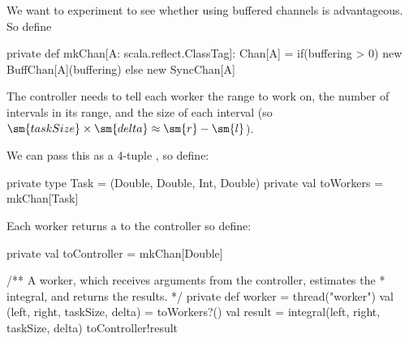 

\begin{slide}

We want to experiment to see whether using buffered channels is advantageous.
So define
\begin{scala}
  private def mkChan[A: scala.reflect.ClassTag]: Chan[A] = 
    if(buffering > 0) new BuffChan[A](buffering) else new SyncChan[A]
\end{scala}

The controller needs to tell each worker the range \SCALA{[l,r]} to work on,
the number  of intervals in its range, and the size
 of each interval (so $\sm{taskSize} \times \sm{delta} \approx
\sm{r} - \sm{l}$).

We can pass this as a 4-tuple , so define:
%
\begin{scala}
  private type Task = (Double, Double, Int, Double)
  private val toWorkers = mkChan[Task]
\end{scala}

Each worker returns a  to the controller so define:
%
\begin{scala}
  private val toController = mkChan[Double]
\end{scala}
\end{slide}


\begin{slide}

\begin{scala}
  /** A worker, which receives arguments from the controller, estimates the
    * integral, and returns the results. */
  private def worker = thread("worker"){
    val (left, right, taskSize, delta) = toWorkers?()
    val result = integral(left, right, taskSize, delta)
    toController!result
  }
\end{scala}
\end{slide}  


